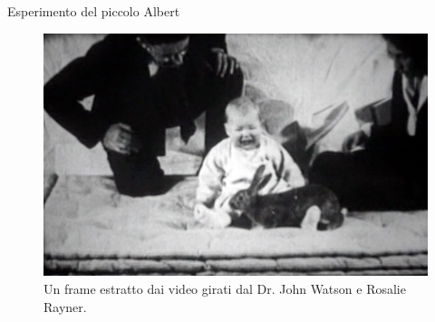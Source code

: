 \documentclass[12pt]{book} %
\begin{document}
\bigskip
\begin{mdframed}[linewidth=1pt]
Esperimento del piccolo Albert

\begin{figure}
  \centering
  \includegraphics[width=0.95\linewidth]{images/Libro-img002.jpg}
  \begin{minipage}{\linewidth}
    \caption{Un frame estratto dai video girati dal Dr. John Watson e Rosalie Rayner.}
  \end{minipage}
\end{figure}


\end{mdframed}
\end{document}
